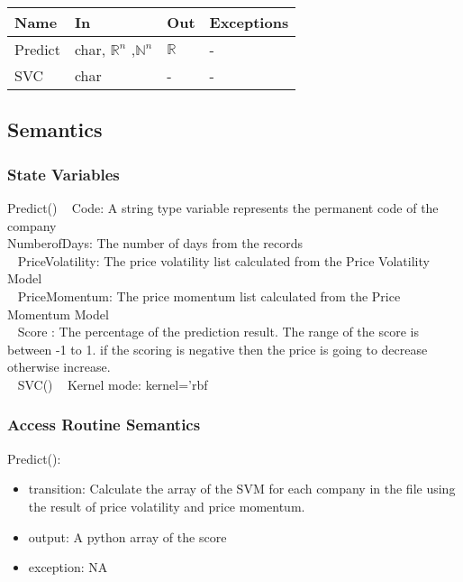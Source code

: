 \documentclass[12pt, titlepage]{article}
\begin{document}
\begin{center}
\begin{tabular}{p{2cm} p{4cm} p{2cm} p{2cm}}
\hline
\textbf{Name} & \textbf{In} & \textbf{Out} & \textbf{Exceptions} \\
\hline

Predict & char, $\mathbb{R}^n$ ,$\mathbb{N}^n$ & $\mathbb{R}$ &- \\
SVC &char &- & - \\ 
\hline
\end{tabular}
\end{center}

\subsection{Semantics}
\subsubsection{State Variables}
Predict()
~\newline
Code: A string type variable represents the permanent code of the company\\ 
NumberofDays: The number of days from the records\\ 
~\newline
PriceVolatility: The price volatility list calculated from the Price Volatility Model\\
~\newline
PriceMomentum: The price momentum list calculated from the Price Momentum Model\\
~\newline
Score : The percentage of the prediction result. The range of the score is between -1 to 1. if the scoring is negative then the price is going to decrease otherwise increase. \\
~\newline
SVC()
~\newline
Kernel mode: kernel='rbf
\subsubsection{Access Routine Semantics}

\noindent Predict():
\begin{itemize}
\item transition: Calculate the array of the SVM for each company in the file using the result of price volatility and price momentum.
\item output: A python array of the score
\item exception: NA
\end{itemize}
\end{document}
